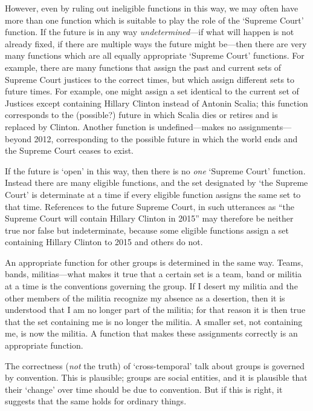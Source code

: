 \documentclass[11pt]{article}
\begin{document}
\begin{spacing}{1.5}
However, even by ruling out ineligible functions in this way, we may
often have more than one function which is suitable to play the role
of the `Supreme Court' function.  If the future is in any way {\em
  undetermined}---if what will happen is not already fixed, if there
are multiple ways the future might be---then there are very many
functions which are all equally appropriate `Supreme Court' functions.
For example, there are many functions that assign the past and current
sets of Supreme Court justices to the correct times, but which assign
different sets to future times.  For example, one might assign a set
identical to the current set of Justices except containing Hillary
Clinton instead of Antonin Scalia; this function corresponds to the
(possible?) future in which Scalia dies or retires and is replaced by
Clinton.  Another function is undefined---makes no
assignments---beyond 2012, corresponding to the possible future in
which the world ends and the Supreme Court ceases to exist.

If the future is `open' in this way, then there is no {\em one}
`Supreme Court' function.  Instead there are many eligible functions,
and the set designated by `the Supreme Court' is determinate at a time
if every eligible function assigns the same set to that time.
References to the future Supreme Court, in such utterances as ``the
Supreme Court will contain Hillary Clinton in 2015'' may therefore be
neither true nor false but indeterminate, because some eligible
functions assign a set containing Hillary Clinton to 2015 and others
do not.


An appropriate function for other groups is determined in the same
way.  Teams, bands, militias---what makes it true that a certain set
is a team, band or militia at a time is the conventions governing the
group.  If I desert my militia and the other members of the militia
recognize my absence as a desertion, then it is understood that I am
no longer part of the militia; for that reason it is then true that
the set containing me is no longer the militia.  A smaller set, not
containing me, is now the militia.  A function that makes these
assignments correctly is an appropriate function.

The correctness ({\em not} the truth) of `cross-temporal' talk about
groups is governed by convention.  This is plausible; groups are
social entities, and it is plausible that their `change' over time
should be due to convention.  But if this is right, it suggests that
the same holds for ordinary things.


\end{spacing}
\end{document}
